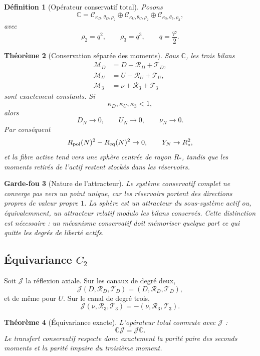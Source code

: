 \documentclass[11pt,a4paper]{article}
\newtheorem{theorem}{Théorème}[section]
\newtheorem{definition}[theorem]{Définition}
\newtheorem{guardrail}[theorem]{Garde-fou}
\begin{document}
\begin{definition}[Opérateur conservatif total]\label{def:v11-total-transfer}
Posons
\[
 \boxed{
 \mathbb C
 =
 \mathcal C_{\kappa_D,\theta_D,\rho_2}
 \oplus
 \mathcal C_{\kappa_U,\theta_U,\rho_2}
 \oplus
 \mathcal C_{\kappa_3,\theta_3,\rho_3},}
\]
avec
\[
 \rho_2=q^2,\qquad
 \rho_3=q^3,\qquad
 q=\frac{\varphi}{2}.
\]
\end{definition}

\begin{theorem}[Conservation séparée des moments]\label{thm:v11-moment-ledgers}
Sous $\mathbb C$, les trois bilans
\[
 \boxed{
 \begin{aligned}
 \mathcal M_D&=D+\mathscr R_D+\mathscr T_D,\\
 \mathcal M_U&=U+\mathscr R_U+\mathscr T_U,\\
 \mathcal M_3&=\nu+\mathscr R_3+\mathscr T_3
 \end{aligned}}
\]
sont exactement constants.
Si
\[
 \kappa_D,\kappa_U,\kappa_3<1,
\]
alors
\[
 \boxed{
 D_N\to0,\qquad
 U_N\to0,\qquad
 \nu_N\to0.}
\]
Par conséquent
\[
 R_{\rm pol}(N)^2-R_{\rm eq}(N)^2\to0,\qquad
 Y_N\to R_*^2,
\]
et la fibre active tend vers une sphère centrée de rayon $R_*$, tandis que les moments retirés de l'actif restent stockés dans les réservoirs.
\end{theorem}

\begin{guardrail}[Nature de l'attracteur]
Le système conservatif complet ne converge pas vers un point unique, car les réservoirs portent des directions propres de valeur propre $1$. La sphère est un \emph{attracteur du sous-système actif} ou, équivalemment, un attracteur relatif modulo les bilans conservés. Cette distinction est nécessaire : un mécanisme conservatif doit mémoriser quelque part ce qui quitte les degrés de liberté actifs.
\end{guardrail}

\subsection{Équivariance $C_2$}

Soit $\mathscr J$ la réflexion axiale. Sur les canaux de degré deux,
\[
 \mathscr J(D,\mathscr R_D,\mathscr T_D)
 =(D,\mathscr R_D,\mathscr T_D),
\]
et de même pour $U$. Sur le canal de degré trois,
\[
 \mathscr J(\nu,\mathscr R_3,\mathscr T_3)
 =-(\nu,\mathscr R_3,\mathscr T_3).
\]

\begin{theorem}[Équivariance exacte]\label{thm:v11-C2}
L'opérateur total commute avec $\mathscr J$ :
\[
 \boxed{\mathbb C\mathscr J=\mathscr J\mathbb C.}
\]
Le transfert conservatif respecte donc exactement la parité paire des seconds moments et la parité impaire du troisième moment.
\end{theorem}
\end{document}
